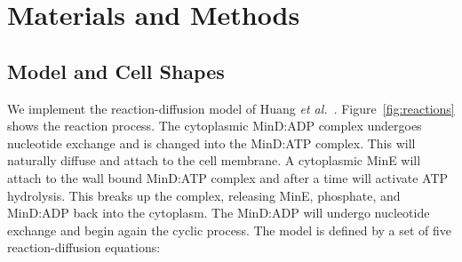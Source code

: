 \documentclass[10pt,letterpaper]{article}
\begin{document}



\section*{Materials and Methods}
\subsection*{Model and Cell Shapes}
\label{sec:model-method-shapes}
We implement the reaction-diffusion model of Huang \emph{et
  al.}~\cite{huang2003dynamic}.  Figure~\ref{fig:reactions} shows the
reaction process.  The cytoplasmic MinD:ADP complex undergoes
nucleotide exchange and is changed into the MinD:ATP complex.  This
will naturally diffuse and attach to the cell membrane.  A cytoplasmic
MinE will attach to the wall bound MinD:ATP complex and after a time
will activate ATP hydrolysis.  This breaks up the complex, releasing
MinE, phosphate, and MinD:ADP back into the cytoplasm.  The MinD:ADP
will undergo nucleotide exchange and begin again the cyclic process.
The model is defined by a set of five reaction-diffusion equations:
\end{document}
